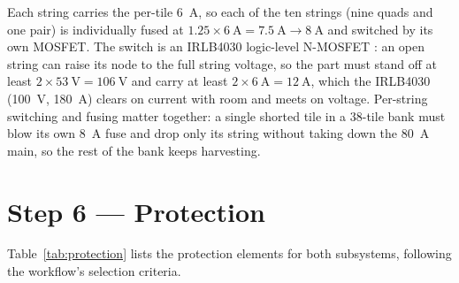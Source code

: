 \documentclass[11pt,a4paper]{article}
\begin{document}
Each string carries the per-tile \SI{6}{\ampere}, so each of the ten strings
(nine quads and one pair) is individually fused at
$1.25\times\SI{6}{\ampere}=\SI{7.5}{\ampere}\to\SI{8}{\ampere}$ and switched by
its own MOSFET. The switch is an IRLB4030 logic-level N-MOSFET
\cite{irlb4030ds}: an open string can raise its node to the full string voltage,
so the part must stand off at least $2\times\SI{53}{\volt}=\SI{106}{\volt}$ and
carry at least $2\times\SI{6}{\ampere}=\SI{12}{\ampere}$, which the IRLB4030
(\SI{100}{\volt}, \SI{180}{\ampere}) clears on current with room and meets on
voltage. Per-string switching and fusing matter together: a single shorted tile
in a \num{38}-tile bank must blow its own \SI{8}{\ampere} fuse and drop only its
string without taking down the \SI{80}{\ampere} main, so the rest of the bank
keeps harvesting.

\section{Step 6 --- Protection}
\label{sec:protection}

Table~\ref{tab:protection} lists the protection elements for both subsystems,
following the workflow's selection criteria.
\end{document}
